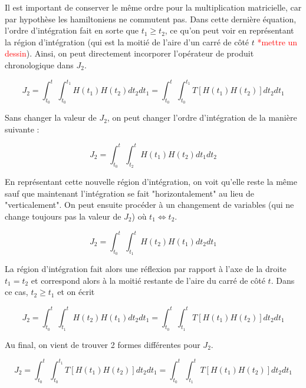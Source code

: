 Il est important de conserver le même ordre pour la multiplication matricielle, car par hypothèse les hamiltoniens ne commutent pas. Dans cette dernière équation, l'ordre d'intégration fait en sorte que $t_1 \geq t_2$, ce qu'on peut voir en représentant la région d'intégration (qui est la moitié de l'aire d'un carré de côté $t$ \textcolor{red}{*mettre un dessin}). Ainsi, on peut directement incorporer l'opérateur de produit chronologique dans $J_2$.

\begin{equation*}
    J_2 = \int_{t_0}^{t}\int_{t_0}^{t_1}H(t_1)H(t_2)dt_2dt_1  = \int_{t_0}^{t}\int_{t_0}^{t_1}T\left[H(t_1)H(t_2)\right]dt_2dt_1
\end{equation*}

Sans changer la valeur de $J_2$, on peut changer l'ordre d'intégration de la manière suivante :

\begin{equation*}
    J_2 = \int_{t_0}^{t}\int_{t_2}^{t}H(t_1)H(t_2)dt_1dt_2
\end{equation*}

En représentant cette nouvelle région d'intégration, on voit qu'elle reste la même sauf que maintenant l'intégration se fait "horizontalement" au lieu de "verticalement". On peut ensuite procéder à un changement de variables (qui ne change toujours pas la valeur de $J_2$) où $t_1 \Leftrightarrow t_2$. 

\begin{equation*}
    J_2 = \int_{t_0}^{t}\int_{t_1}^{t}H(t_2)H(t_1)dt_2dt_1
\end{equation*}

La région d'intégration fait alors une réflexion par rapport à l'axe de la droite $t_1=t_2$ et correspond alors à la moitié restante de l'aire du carré de côté $t$. Dans ce cas, $t_2 \geq t_1$ et on écrit 

\begin{equation*}
    J_2 = \int_{t_0}^{t}\int_{t_1}^{t}H(t_2)H(t_1)dt_2dt_1 = \int_{t_0}^{t}\int_{t_1}^{t}T\left[H(t_1)H(t_2)\right]dt_2dt_1
\end{equation*}

Au final, on vient de trouver 2 formes différentes pour $J_2$.

\begin{equation}
    J_2 = \int_{t_0}^{t}\int_{t_0}^{t_1}T\left[H(t_1)H(t_2)\right]dt_2dt_1 = \int_{t_0}^{t}\int_{t_1}^{t}T\left[H(t_1)H(t_2)\right]dt_2dt_1
\end{equation}

